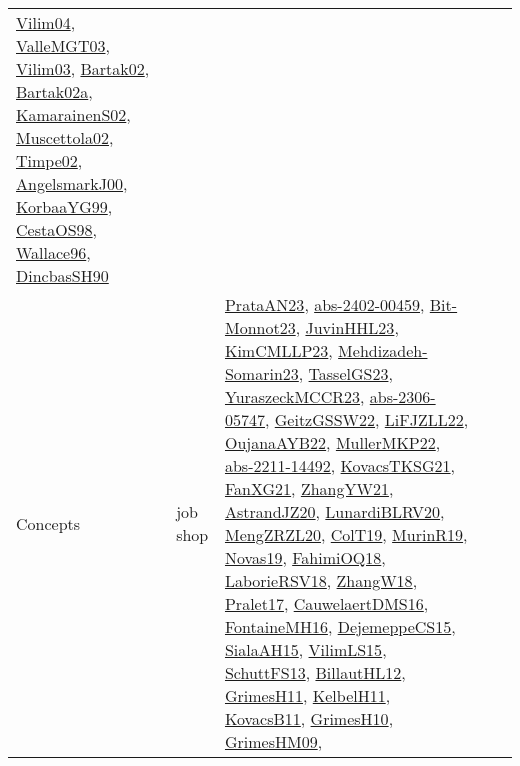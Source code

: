 {\begin{longtable}{lp{3cm}>{\raggedright}p{6cm}>{\raggedright}p{6cm}p{8cm}}
\href{papers/Vilim04.pdf}{Vilim04}\cite{Vilim04}, \href{papers/ValleMGT03.pdf}{ValleMGT03}\cite{ValleMGT03}, \href{papers/Vilim03.pdf}{Vilim03}\cite{Vilim03}, \href{papers/Bartak02.pdf}{Bartak02}\cite{Bartak02}, \href{papers/Bartak02a.pdf}{Bartak02a}\cite{Bartak02a}, \href{papers/KamarainenS02.pdf}{KamarainenS02}\cite{KamarainenS02}, \href{papers/Muscettola02.pdf}{Muscettola02}\cite{Muscettola02}, \href{articles/Timpe02.pdf}{Timpe02}\cite{Timpe02}, \href{papers/AngelsmarkJ00.pdf}{AngelsmarkJ00}\cite{AngelsmarkJ00}, \href{papers/KorbaaYG99.pdf}{KorbaaYG99}\cite{KorbaaYG99}, \href{papers/CestaOS98.pdf}{CestaOS98}\cite{CestaOS98}, \href{articles/Wallace96.pdf}{Wallace96}\cite{Wallace96}, \href{articles/DincbasSH90.pdf}{DincbasSH90}\cite{DincbasSH90}\\
Concepts & job shop & \href{articles/PrataAN23.pdf}{PrataAN23}\cite{PrataAN23}, \href{articles/abs-2402-00459.pdf}{abs-2402-00459}\cite{abs-2402-00459}, \href{papers/Bit-Monnot23.pdf}{Bit-Monnot23}\cite{Bit-Monnot23}, \href{papers/JuvinHHL23.pdf}{JuvinHHL23}\cite{JuvinHHL23}, \href{papers/KimCMLLP23.pdf}{KimCMLLP23}\cite{KimCMLLP23}, \href{papers/Mehdizadeh-Somarin23.pdf}{Mehdizadeh-Somarin23}\cite{Mehdizadeh-Somarin23}, \href{papers/TasselGS23.pdf}{TasselGS23}\cite{TasselGS23}, \href{articles/YuraszeckMCCR23.pdf}{YuraszeckMCCR23}\cite{YuraszeckMCCR23}, \href{articles/abs-2306-05747.pdf}{abs-2306-05747}\cite{abs-2306-05747}, \href{papers/GeitzGSSW22.pdf}{GeitzGSSW22}\cite{GeitzGSSW22}, \href{papers/LiFJZLL22.pdf}{LiFJZLL22}\cite{LiFJZLL22}, \href{papers/OujanaAYB22.pdf}{OujanaAYB22}\cite{OujanaAYB22}, \href{articles/MullerMKP22.pdf}{MullerMKP22}\cite{MullerMKP22}, \href{articles/abs-2211-14492.pdf}{abs-2211-14492}\cite{abs-2211-14492}, \href{papers/KovacsTKSG21.pdf}{KovacsTKSG21}\cite{KovacsTKSG21}, \href{articles/FanXG21.pdf}{FanXG21}\cite{FanXG21}, \href{articles/ZhangYW21.pdf}{ZhangYW21}\cite{ZhangYW21}, \href{articles/AstrandJZ20.pdf}{AstrandJZ20}\cite{AstrandJZ20}, \href{articles/LunardiBLRV20.pdf}{LunardiBLRV20}\cite{LunardiBLRV20}, \href{articles/MengZRZL20.pdf}{MengZRZL20}\cite{MengZRZL20}, \href{papers/ColT19.pdf}{ColT19}\cite{ColT19}, \href{papers/MurinR19.pdf}{MurinR19}\cite{MurinR19}, \href{articles/Novas19.pdf}{Novas19}\cite{Novas19}, \href{articles/FahimiOQ18.pdf}{FahimiOQ18}\cite{FahimiOQ18}, \href{articles/LaborieRSV18.pdf}{LaborieRSV18}\cite{LaborieRSV18}, \href{articles/ZhangW18.pdf}{ZhangW18}\cite{ZhangW18}, \href{papers/Pralet17.pdf}{Pralet17}\cite{Pralet17}, \href{papers/CauwelaertDMS16.pdf}{CauwelaertDMS16}\cite{CauwelaertDMS16}, \href{papers/FontaineMH16.pdf}{FontaineMH16}\cite{FontaineMH16}, \href{papers/DejemeppeCS15.pdf}{DejemeppeCS15}\cite{DejemeppeCS15}, \href{papers/SialaAH15.pdf}{SialaAH15}\cite{SialaAH15}, \href{papers/VilimLS15.pdf}{VilimLS15}\cite{VilimLS15}, \href{papers/SchuttFS13.pdf}{SchuttFS13}\cite{SchuttFS13}, \href{papers/BillautHL12.pdf}{BillautHL12}\cite{BillautHL12}, \href{papers/GrimesH11.pdf}{GrimesH11}\cite{GrimesH11}, \href{articles/KelbelH11.pdf}{KelbelH11}\cite{KelbelH11}, \href{articles/KovacsB11.pdf}{KovacsB11}\cite{KovacsB11}, \href{papers/GrimesH10.pdf}{GrimesH10}\cite{GrimesH10}, \href{papers/GrimesHM09.pdf}{GrimesHM09}\cite{GrimesHM09}, 
\end{longtable}}
